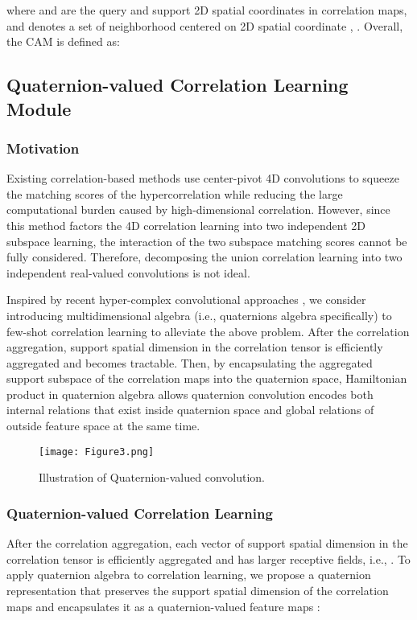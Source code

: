 \documentclass[lettersize,journal]{IEEEtran}
\begin{document}
\begin{small}

\end{small}


\noindent where  and  are the query and support 2D spatial coordinates in correlation maps, and  denotes a set of neighborhood centered on 2D spatial coordinate , . Overall, the CAM is defined as:



\subsection{Quaternion-valued Correlation Learning Module}\label{4.6}
\subsubsection{Motivation}
Existing correlation-based methods \cite{RN38, RN85} use center-pivot 4D convolutions to squeeze the matching scores of the hypercorrelation while reducing the large computational burden caused by high-dimensional correlation. However, since this method factors the 4D correlation learning into two independent 2D subspace learning, the interaction of the two subspace matching scores cannot be fully considered. Therefore, decomposing the union correlation learning into two independent real-valued convolutions is not ideal. 

Inspired by recent hyper-complex convolutional approaches \cite{RN27, RN29, RN60, RN61}, we consider introducing multidimensional algebra (i.e., quaternions algebra specifically) to few-shot correlation learning to alleviate the above problem. After the correlation aggregation, support spatial dimension in the correlation tensor is efficiently aggregated and becomes tractable. Then, by encapsulating the aggregated support subspace of the correlation maps into the quaternion space, Hamiltonian product in quaternion algebra allows quaternion convolution encodes both internal relations that exist inside quaternion space and global relations of outside feature space at the same time. 

\begin{figure}[t]
\centering
 \texttt{[image: Figure3.png]}
\caption{Illustration of Quaternion-valued convolution.
\label{Figure3}}
\end{figure} 

\subsubsection{Quaternion-valued Correlation Learning}
After the correlation aggregation, each vector of support spatial dimension in the correlation tensor is efficiently aggregated and has larger receptive fields, i.e., . To apply quaternion algebra to correlation learning, we propose a quaternion representation that preserves the support spatial dimension of the correlation maps   and encapsulates it as a quaternion-valued feature maps :
\end{document}
